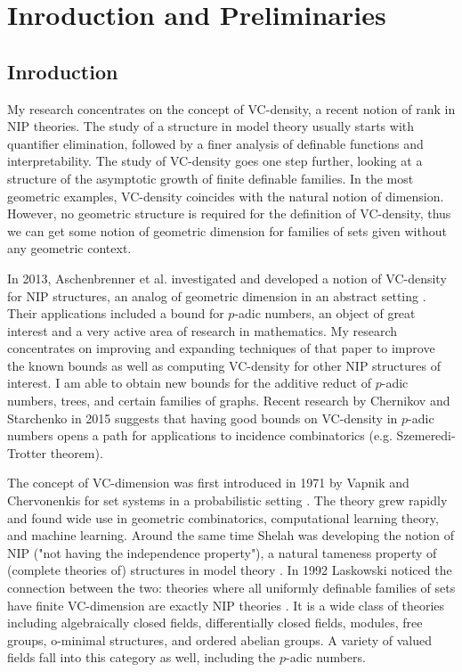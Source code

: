 \chapter{Inroduction and Preliminaries}

\section{Inroduction}

My research concentrates on the concept of VC-density, a recent notion of rank in NIP theories.
The study of a structure in model theory usually starts with quantifier elimination, followed by a finer analysis of definable functions and interpretability.
The study of VC-density goes one step further, looking at a structure of the asymptotic growth of finite definable families.
In the most geometric examples, VC-density coincides with the natural notion of dimension.
However, no geometric structure is required for the definition of VC-density, thus we can get some notion of geometric dimension for families of sets given without any geometric context.

In 2013, Aschenbrenner et al. investigated and developed a notion of VC-density for NIP structures, an analog of geometric dimension in an abstract setting \cite{density}. Their applications included a bound for $p$-adic numbers, an object of great interest and a very active area of research in mathematics. My research concentrates on improving and expanding techniques of that paper to improve the known bounds as well as computing VC-density for other NIP structures of interest. I am able to obtain new bounds for the additive reduct of $p$-adic numbers, trees, and certain families of graphs. Recent research by Chernikov and Starchenko in 2015 \cite{regularity} suggests that having good bounds on VC-density in $p$-adic numbers opens a path for applications to incidence combinatorics (e.g. Szemeredi-Trotter theorem).

The concept of VC-dimension was first introduced in 1971 by Vapnik and Chervonenkis for set systems in a probabilistic setting \cite{vc71}.
The theory grew rapidly and found wide use in geometric combinatorics, computational learning theory, and machine learning.
Around the same time Shelah was developing the notion of NIP ("not having the independence property"),
a natural tameness property of (complete theories of) structures in model theory \cite{shelah_nip}.
In 1992 Laskowski noticed the connection between the two: theories where all uniformly definable families of sets have finite VC-dimension are exactly NIP theories \cite{laskowski92}.
It is a wide class of theories including algebraically closed fields, differentially closed fields, modules, free groups, o-minimal structures, and ordered abelian groups.
A variety of valued fields fall into this category as well, including the $p$-adic numbers.

